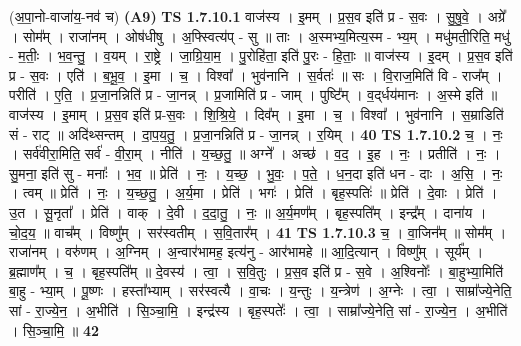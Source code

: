 \documentclass[17pt]{extarticle}
\begin{document}
                  \newline
                      (अ॒पा॒नो-वाजा॑य॒-नव॑ च)  \textbf{(A9)} \newline \newline
                                \textbf{ TS 1.7.10.1} \newline
                  वाज॑स्य । इ॒मम् । प्र॒स॒व इति॑ प्र - स॒वः । सु॒षु॒वे॒ । अग्रे᳚ । सोम᳚म् । राजा॑नम् । ओष॑धीषु । अ॒फ्स्वित्य॑प् - सु ॥ ताः । अ॒स्मभ्य॒मित्य॒स्म - भ्य॒म् । मधु॑मती॒रिति॒ मधु॑ - म॒तीः॒ । भ॒व॒न्तु॒ । व॒यम् । रा॒ष्ट्रे । जा॒ग्रि॒या॒म॒ । पु॒रोहि॑ता॒ इति॑ पु॒रः - हि॒ताः॒ ॥ वाज॑स्य । इ॒दम् । प्र॒स॒व इति॑ प्र - स॒वः । एति॑ । ब॒भू॒व॒ । इ॒मा । च॒ । विश्वा᳚ । भुव॑नानि । स॒र्वतः॑ ॥ सः । वि॒राज॒मिति॑ वि - राज᳚म् । परीति॑ । ए॒ति॒ । प्र॒जा॒नन्निति॑ प्र - जा॒नन्न् । प्र॒जामिति॑ प्र - जाम् । पुष्टि᳚म् । व॒द्‌र्धय॑मानः । अ॒स्मे इति॑ ॥ वाज॑स्य । इ॒माम् । प्र॒स॒व इति॑ प्र-स॒वः । शि॒श्रि॒ये॒ । दिव᳚म् । इ॒मा । च॒ । विश्वा᳚ । भुव॑नानि । स॒म्राडिति॑ सं - राट् ॥ अदि॑थ्सन्तम् । दा॒प॒य॒तु॒ । प्र॒जा॒नन्निति॑ प्र - जा॒नन्न् । र॒यिम् । \textbf{  40} \newline
                  \newline
                                \textbf{ TS 1.7.10.2} \newline
                  च॒ । नः॒ । सर्व॑वीरा॒मिति॒ सर्व॑ - वी॒रा॒म् । नीति॑ । य॒च्छ॒तु॒ ॥ अग्ने᳚ । अच्छ॑ । व॒द॒ । इ॒ह । नः॒ । प्रतीति॑ । नः॒ । सु॒मना॒ इति॑ सु - मनाः᳚ । भ॒व॒ ॥ प्रेति॑ । नः॒ । य॒च्छ॒ । भु॒वः॒ । प॒ते॒ । ध॒न॒दा इति॑ धन - दाः । अ॒सि॒ । नः॒ । त्वम् ॥ प्रेति॑ । नः॒ । य॒च्छ॒तु॒ । अ॒र्य॒मा । प्रेति॑ । भगः॑ । प्रेति॑ । बृह॒स्पतिः॑ ॥ प्रेति॑ । दे॒वाः । प्रेति॑ । उ॒त । सू॒नृता᳚ । प्रेति॑ । वाक् । दे॒वी । द॒दा॒तु॒ । नः॒ ॥ अ॒र्य॒मण᳚म् । बृह॒स्पति᳚म् । इन्द्र᳚म् । दाना॑य । चो॒द॒य॒ ॥ वाच᳚म् । विष्णु᳚म् । सर॑स्वतीम् । स॒वि॒तार᳚म् । \textbf{  41} \newline
                  \newline
                                \textbf{ TS 1.7.10.3} \newline
                  च॒ । वा॒जिन᳚म् ॥ सोम᳚म् । राजा॑नम् । वरु॑णम् । अ॒ग्निम् । अ॒न्वार॑भामह॒ इत्य॑नु - आर॑भामहे ॥ आ॒दि॒त्यान् । विष्णु᳚म् । सूर्य᳚म् । ब्र॒ह्माण᳚म् । च॒ । बृह॒स्पति᳚म् ॥ दे॒वस्य॑ । त्वा॒ । स॒वि॒तुः । प्र॒स॒व इति॑ प्र - स॒वे । अ॒श्विनोः᳚ । बा॒हुभ्या॒मिति॑ बा॒हु - भ्या॒म् । पू॒ष्णः । हस्ता᳚भ्याम् । सर॑स्वत्यै । वा॒चः । य॒न्तुः । य॒न्त्रेण॑ । अ॒ग्नेः । त्वा॒ । साम्रा᳚ज्ये॒नेति॒ सां - रा॒ज्ये॒न॒ । अ॒भीति॑ । सि॒ञ्चा॒मि॒ । इन्द्र॑स्य । बृह॒स्पतेः᳚ । त्वा॒ । साम्रा᳚ज्ये॒नेति॒ सां - रा॒ज्ये॒न॒ । अ॒भीति॑ । सि॒ञ्चा॒मि॒ ॥ \textbf{  42} \newline
\end{document}
